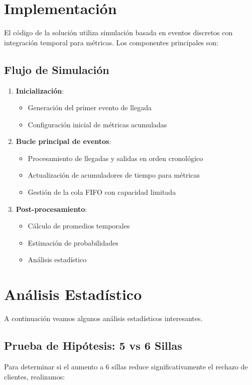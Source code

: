 \documentclass{article}
\begin{document}
\section{Implementación}
El código de la solución utiliza simulación basada en eventos discretos con integración temporal para métricas. Los componentes principales son:

\subsection{Flujo de Simulación}
\begin{enumerate}
    \item \textbf{Inicialización}:
    \begin{itemize}
        \item Generación del primer evento de llegada
        \item Configuración inicial de métricas acumuladas
    \end{itemize}
    
    \item \textbf{Bucle principal de eventos}:
    \begin{itemize}
        \item Procesamiento de llegadas y salidas en orden cronológico
        \item Actualización de acumuladores de tiempo para métricas
        \item Gestión de la cola FIFO con capacidad limitada
    \end{itemize}
    
    \item \textbf{Post-procesamiento}:
    \begin{itemize}
        \item Cálculo de promedios temporales
        \item Estimación de probabilidades
        \item Análisis estadístico
    \end{itemize}
\end{enumerate}

\section{Análisis Estadístico}

A continuación veamos algunos análisis estadísticos interesantes.

\subsection{Prueba de Hipótesis: 5 vs 6 Sillas}
Para determinar si el aumento a 6 sillas reduce significativamente el rechazo de clientes, realizamos:
\end{document}
